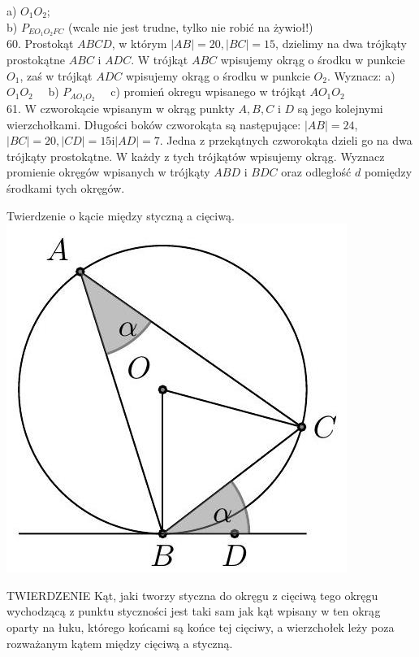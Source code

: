 \documentclass[10pt]{article}
\begin{document}
a) \(O_{1} O_{2}\);\\
b) \(P_{E O_{1} O_{2} F C}\) (wcale nie jest trudne, tylko nie robić na żywioł!)\\
60. Prostokąt \(A B C D\), w którym \(|A B|=20,|B C|=15\), dzielimy na dwa trójkąty prostokątne \(A B C\) i \(A D C\). W trójkąt \(A B C\) wpisujemy okrąg o środku w punkcie \(O_{1}\), zaś w trójkąt \(A D C\) wpisujemy okrąg o środku w punkcie \(O_{2}\). Wyznacz: a) \(O_{1} O_{2} \quad\) b) \(P_{A O_{1} O_{2}} \quad\) c) promień okregu wpisanego w trójkąt \(A O_{1} O_{2}\)\\
61. W czworokącie wpisanym w okrąg punkty \(A, B, C\) i \(D\) są jego kolejnymi wierzchołkami. Długości boków czworokąta są następujące: \(|A B|=24\), \(|B C|=20,|C D|=15 \mathrm{i}|A D|=7\). Jedna z przekątnych czworokąta dzieli go na dwa trójkąty prostokątne. W każdy z tych trójkątów wpisujemy okrąg. Wyznacz promienie okręgów wpisanych w trójkąty \(A B D\) i \(B D C\) oraz odległość \(d\) pomiędzy środkami tych okręgów.

Twierdzenie o kącie między styczną a cięciwą.\\
\includegraphics[max width=\textwidth, center]{2024_11_21_e9b4faa005d5be2cc318g-044(1)}

TWIERDZENIE Kąt, jaki tworzy styczna do okręgu z cięciwą tego okręgu wychodzącą z punktu styczności jest taki sam jak kąt wpisany w ten okrąg oparty na łuku, którego końcami są końce tej cięciwy, a wierzchołek leży poza rozważanym kątem między cięciwą a styczną.
\end{document}

